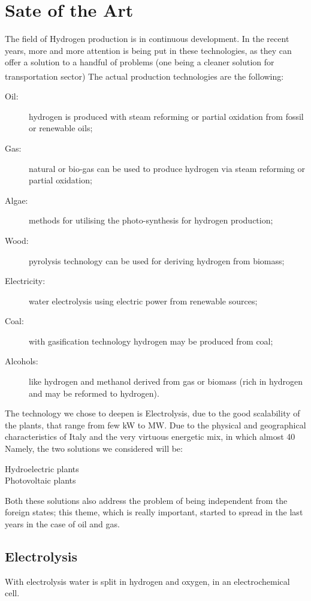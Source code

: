 \section{Sate of the Art}
The field of Hydrogen production is in continuous development.
In the recent years, more and more attention is being put in these technologies, as they can offer a solution to a handful of problems (one being a cleaner solution for transportation sector)
The actual production technologies are the following\textsuperscript{\cite{guanda20211}}:
\begin{description}
    \item[Oil:] hydrogen is produced with steam reforming or partial oxidation from fossil or renewable oils;
    \item[Gas:] natural or bio-gas can be used to produce hydrogen via steam reforming or partial oxidation;
    \item[Algae:] methods for utilising the photo-synthesis for hydrogen production;
    \item[Wood:] pyrolysis technology can be used for deriving hydrogen from biomass;
    \item[Electricity:] water electrolysis using electric power from renewable sources;
    \item[Coal:] with gasification technology hydrogen may be produced from coal;
    \item[Alcohols:] like hydrogen and methanol derived from gas or biomass (rich in hydrogen and may be reformed to hydrogen).
\end{description}

The technology we chose to deepen is Electrolysis, due to the good scalability of the plants, that range from few kW to MW.
Due to the physical and geographical characteristics of Italy and the very virtuous energetic mix, in which almost 40%
Namely, the two solutions we considered will be:
\begin{description}
    \item[Hydroelectric plants] 
    \item[Photovoltaic plants] 
\end{description}

Both these solutions also address the problem of being independent from the foreign states; this theme, which is really important, started to spread in the last years in the case of oil and gas.

\subsection{Electrolysis}
With electrolysis water is split in hydrogen and oxygen, in an electrochemical cell.

